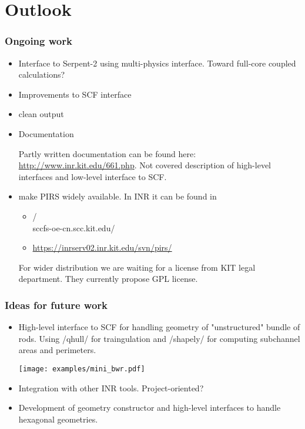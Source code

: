 
\section{Outlook}

\begin{frame}[fragile]
    \frametitle{Ongoing work}

    \begin{itemize}
        \item Interface to Serpent-2 using multi-physics interface. Toward full-core coupled calculations?
        \item Improvements to SCF interface
        \item clean output
        \item Documentation

            Partly written documentation can be found here:
            \url{http://www.inr.kit.edu/661.php}. Not covered description of
            high-level interfaces and low-level interface to SCF.

        \item make PIRS widely available. In INR it can be found in
            \begin{itemize}
                \item \bashinline/\\sccfs-oe-cn.scc.kit.edu\INR\Gruppen\RPD\Software\PIRS/
                \item \url{https://inrserv02.inr.kit.edu/svn/pirs/}
            \end{itemize}

            For wider distribution we are waiting for a license from KIT legal
            department. They currently propose  GPL license.

    \end{itemize}
\end{frame}

\begin{frame}[fragile]
    \frametitle{Ideas for future work}
        \begin{itemize}
            \item High-level interface to SCF for handling geometry of "unstructured" bundle of rods. Using \bashinline/qhull/ for traingulation 
                  and \bashinline/shapely/ for computing subchannel areas and perimeters.

                  \texttt{[image: examples/mini\_bwr.pdf]}

            \item Integration with other INR tools. Project-oriented? 
                
            \item Development of geometry constructor and high-level interfaces to handle hexagonal geometries.
        \end{itemize}
\end{frame}
